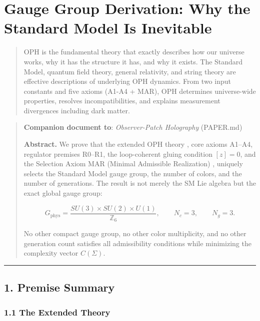 \section{Gauge Group Derivation: Why the Standard Model Is Inevitable}\label{gauge-group-derivation-why-the-standard-model-is-inevitable}

\begin{quote}
OPH is the fundamental theory that exactly describes how our universe works, why it has the structure it has, and why it exists. The Standard Model, quantum field theory, general relativity, and string theory are effective descriptions of underlying OPH dynamics. From two input constants and five axioms (A1-A4 + MAR), OPH determines universe-wide properties, resolves incompatibilities, and explains measurement divergences including dark matter.
\end{quote}

\begin{quote}
\textbf{Companion document to}: \emph{Observer-Patch Holography} (PAPER.md)

\textbf{Abstract.} We prove that the extended OPH theory , core axioms A1--A4, regulator premises R0--R1, the loop-coherent gluing condition \([z]=0\), and the Selection Axiom MAR (Minimal Admissible Realization) , uniquely selects the Standard Model gauge group, the number of colors, and the number of generations. The result is not merely the SM Lie algebra but the exact global gauge group:

\[G_{\mathrm{phys}} = \frac{SU(3) \times SU(2) \times U(1)}{\mathbb{Z}_6}, \qquad N_c = 3, \qquad N_g = 3.\]

No other compact gauge group, no other color multiplicity, and no other generation count satisfies all admissibility conditions while minimizing the complexity vector \(C(\Sigma)\).
\end{quote}

\begin{center}\rule{0.5\linewidth}{0.5pt}\end{center}

\subsection{1. Premise Summary}\label{1-premise-summary}

\subsubsection{1.1 The Extended Theory}\label{11-the-extended-theory}

